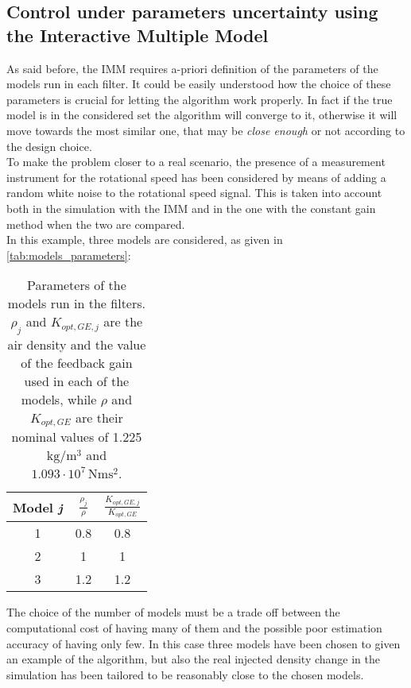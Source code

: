 \subsection{Control under parameters uncertainty using the Interactive Multiple Model}
As said before, the IMM requires a-priori definition of the parameters of the models run in each filter. It could be easily understood how the choice of these parameters is crucial for letting the algorithm work properly. In fact if the true model is in the considered set the algorithm will converge to it, otherwise it will move towards the most similar one, that may be \textit{close enough} or not according to the design choice.\\
To make the problem closer to a real scenario, the presence of a measurement instrument for the rotational speed has been considered by means of adding a random white noise to the rotational speed signal. This is taken into account both in the simulation with the IMM and in the one with the constant gain method when the two are compared. \\
In this example, three models are considered, as given in \autoref{tab:models_parameters}:
\begin{table}[!htbp]
  \centering
  \caption{Parameters of the models run in the filters. $\rho_j$ and $K_{opt,GE,j}$ are the air density and the value of the feedback gain used in each of the models, while $\rho$ and $K_{opt,GE}$ are their nominal values of 1.225 $\si{\kilo\gram\per\cubic\meter}$ and $1.093\cdot10^{7} \, \si{\newton\meter\square\second}$.}
  \begin{tabular}{ccc}
    \toprule
    Model \textit{j} & $\frac{\rho_j}{\rho}$ & $\frac{K_{opt,GE,j}}{K_{opt,GE}}$  \\
    \midrule
    1 & 0.8 & 0.8\\
    2 & 1 & 1\\
    3 & 1.2 & 1.2\\
    \bottomrule
  \end{tabular}
  \label{tab:models_parameters}
\end{table}

The choice of the number of models must be a trade off between the computational cost of having many of them and the possible poor estimation accuracy of having only few. In this case three models have been chosen to given an example of the algorithm, but also the real injected density change in the simulation has been tailored to be reasonably close to the chosen models.  

